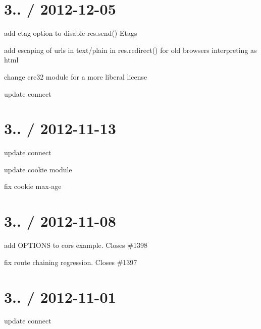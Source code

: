 {\ttfamily \section*{3.. / 2012-\/12-\/05 }}

{\ttfamily }

{\ttfamily 
\begin{DoxyItemize}
\item add \textquotesingle{}etag\textquotesingle{} option to disable {\ttfamily res.\+send()} Etags
\item add escaping of urls in text/plain in {\ttfamily res.\+redirect()} for old browsers interpreting as html
\item change crc32 module for a more liberal license
\item update connect
\end{DoxyItemize}}

{\ttfamily \section*{3.. / 2012-\/11-\/13 }}

{\ttfamily }

{\ttfamily 
\begin{DoxyItemize}
\item update connect
\item update cookie module
\item fix cookie max-\/age
\end{DoxyItemize}}

{\ttfamily \section*{3.. / 2012-\/11-\/08 }}

{\ttfamily }

{\ttfamily 
\begin{DoxyItemize}
\item add O\+P\+T\+I\+O\+NS to cors example. Closes \#1398
\item fix route chaining regression. Closes \#1397
\end{DoxyItemize}}

{\ttfamily \section*{3.. / 2012-\/11-\/01 }}

{\ttfamily }

{\ttfamily 
\begin{DoxyItemize}
\item update connect
\end{DoxyItemize}}

